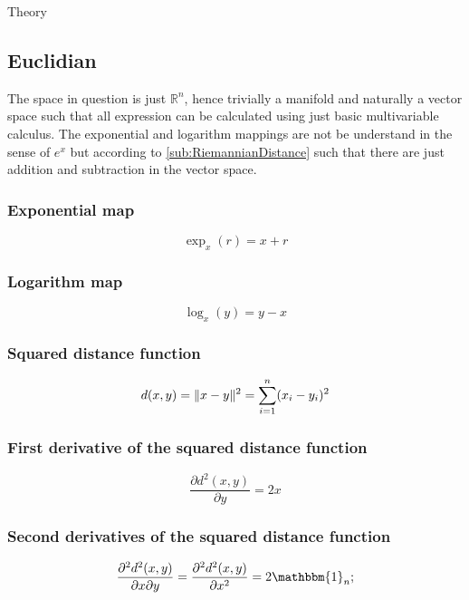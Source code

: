 \begin{chapter}{Theory}
\subsection{Euclidian} %
\label{sub:Euclidian}
The space in question is just $\mathbb{R}^n$, hence trivially a manifold and naturally a vector space such that all expression can be calculated using just basic
multivariable calculus. The exponential and logarithm mappings are not be understand in the sense of $e^x$ but according to \ref{sub:RiemannianDistance} such that
there are just addition and subtraction in the vector space.

\subsubsection{Exponential map} %
\label{ssub:ExponentialEUC}
\begin{equation}
    \exp_x(r)=x+r    
\end{equation}

\subsubsection{Logarithm map} %
\label{ssub:LogarithEUC}
\begin{equation}
    \log_x(y)=y-x
\end{equation}

\subsubsection{Squared distance function} %
\label{ssub:SquareddistanceEUC}
\begin{equation}
    d(x,y)=\| x-y \|^{2}=\sum_{i=1}^n(x_i-y_i)^{2}
\end{equation}

\subsubsection{First derivative of the squared distance function} %
\label{ssub:FirstDerEUC}
\begin{equation}
    \frac{\partial d^2(x,y)}{\partial y}=2x
\end{equation}

\subsubsection{Second derivatives of the squared distance function} %
\label{ssub:SecondDerEUC}
\begin{equation}
    \frac{\partial^2 d^2(x,y)}{\partial x\partial y}=\frac{\partial^2 d^2(x,y)}{\partial x^2}=2\mathbbm{1}_n;
\end{equation}


\end{chapter}
